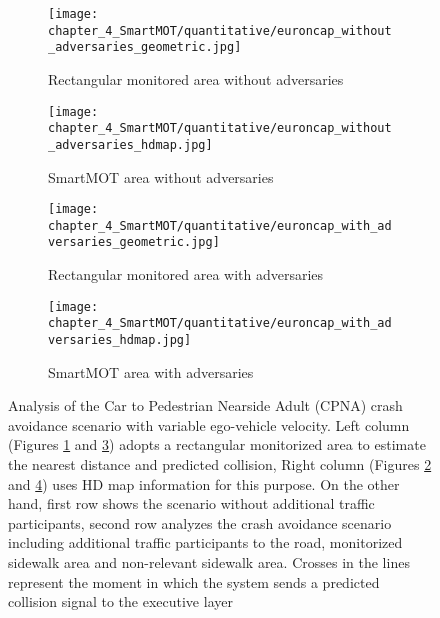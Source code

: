 \begin{figure}[h]
	\centering
	\begin{subfigure}{0.45\textwidth}
		\texttt{[image: chapter\_4\_SmartMOT/quantitative/euroncap\_without\_adversaries\_geometric.jpg]}
		\caption{Rectangular monitored area without adversaries}
		\label{subfig:chapter_4_SmartMOT/euroncap_graphics_a}
	\end{subfigure}
	\hfill
	\begin{subfigure}{0.45\textwidth}
		\texttt{[image: chapter\_4\_SmartMOT/quantitative/euroncap\_without\_adversaries\_hdmap.jpg]}
		\caption{SmartMOT area without adversaries}
		\label{subfig:chapter_4_SmartMOT/euroncap_graphics_b}
	\end{subfigure}
	\hfill
	\begin{subfigure}{0.45\textwidth}
		\texttt{[image: chapter\_4\_SmartMOT/quantitative/euroncap\_with\_adversaries\_geometric.jpg]}
		\caption{Rectangular monitored area with adversaries}
		\label{subfig:chapter_4_SmartMOT/euroncap_graphics_c}
	\end{subfigure}
	\hfill
	\begin{subfigure}{0.45\textwidth}
		\texttt{[image: chapter\_4\_SmartMOT/quantitative/euroncap\_with\_adversaries\_hdmap.jpg]}
		\caption{SmartMOT area with adversaries}
		\label{subfig:chapter_4_SmartMOT/euroncap_graphics_d}
	\end{subfigure}
	\captionsetup{justification=justified}
	\caption[Analysis of the Car to Pedestrian Nearside Adult (CPNA) crash avoidance scenario with variable ego-vehicle velocity]{Analysis of the Car to Pedestrian Nearside Adult (CPNA) crash avoidance scenario with variable ego-vehicle velocity. Left column (Figures \ref{subfig:chapter_4_SmartMOT/euroncap_graphics_a} and \ref{subfig:chapter_4_SmartMOT/euroncap_graphics_c}) adopts a rectangular monitorized area to estimate the nearest distance and predicted collision, Right column (Figures \ref{subfig:chapter_4_SmartMOT/euroncap_graphics_b} and \ref{subfig:chapter_4_SmartMOT/euroncap_graphics_d}) uses HD map information for this purpose. On the other hand, first row shows the scenario without additional traffic participants, second row analyzes the crash avoidance scenario including additional traffic participants to the road, monitorized sidewalk area and non-relevant sidewalk area. Crosses in the lines represent the moment in which the system sends a predicted collision signal to the executive layer}
	\label{fig:4_cpna_results}
\end{figure}

